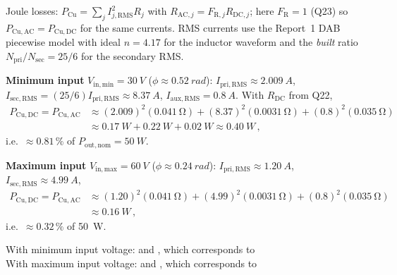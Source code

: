 \documentclass{PELsmallreport}
\begin{document}
\begin{framed}
	\vspace{2em}
Joule losses: $P_{\mathrm{Cu}}=\sum_j I_{j,\mathrm{RMS}}^2 R_j$ with $R_{\mathrm{AC},j}=F_{\mathrm{R},j}R_{\mathrm{DC},j}$; here $F_{\mathrm{R}}=\num{1}$ (Q23) so $P_{\mathrm{Cu,AC}}=P_{\mathrm{Cu,DC}}$ for the same currents.
RMS currents use the Report~1 DAB piecewise model with ideal $n=\num{4.17}$ for the inductor waveform and the \emph{built} ratio $N_{\mathrm{pri}}/N_{\mathrm{sec}}=\num{25}/\num{6}$ for the secondary RMS.

\textbf{Minimum input} $V_{\mathrm{in,min}}=\SI{30}{V}$ ($\phi\approx\SI{0.52}{rad}$): $I_{\mathrm{pri,RMS}}\approx\SI{2.009}{A}$, $I_{\mathrm{sec,RMS}}=(\num{25}/\num{6})I_{\mathrm{pri,RMS}}\approx\SI{8.37}{A}$, $I_{\mathrm{aux,RMS}}=\SI{0.8}{A}$. With $R_{\mathrm{DC}}$ from Q22,
\begin{align}
  P_{\mathrm{Cu,DC}} = P_{\mathrm{Cu,AC}} &\approx (\num{2.009})^2(\SI{0.041}{\ohm}) + (\num{8.37})^2(\SI{0.0031}{\ohm}) + (\num{0.8})^2(\SI{0.035}{\ohm})\\
  &\approx \SI{0.17}{W}+\SI{0.22}{W}+\SI{0.02}{W}\approx\SI{0.40}{W}\,,
\end{align}
i.e.\ $\approx\num{0.81}\,\%$ of $P_{\mathrm{out,nom}}=\SI{50}{W}$.

\textbf{Maximum input} $V_{\mathrm{in,max}}=\SI{60}{V}$ ($\phi\approx\SI{0.24}{rad}$): $I_{\mathrm{pri,RMS}}\approx\SI{1.20}{A}$, $I_{\mathrm{sec,RMS}}\approx\SI{4.99}{A}$,
\begin{align}
  P_{\mathrm{Cu,DC}} = P_{\mathrm{Cu,AC}} &\approx (\num{1.20})^2(\SI{0.041}{\ohm}) + (\num{4.99})^2(\SI{0.0031}{\ohm}) + (\num{0.8})^2(\SI{0.035}{\ohm})\\
  &\approx\SI{0.16}{W}\,,
\end{align}
i.e.\ $\approx\num{0.32}\,\%$ of \SI{50}{W}.
	\vspace{2em}
\end{framed}

With minimum input voltage:
 and , which corresponds to \\

With maximum input voltage:
 and , which corresponds to \\
\end{document}
